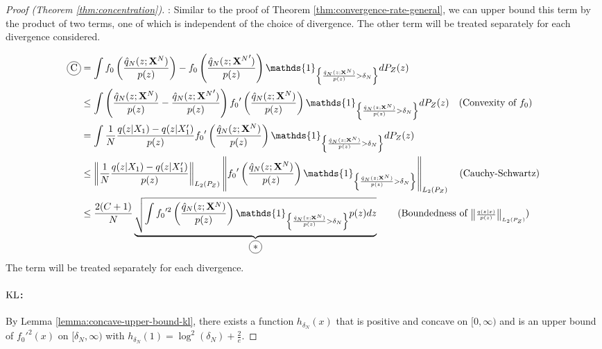 \begin{proof}[Proof (Theorem \ref{thm:concentration})]
: Similar to the proof of Theorem \ref{thm:convergence-rate-general}, we can upper bound this term by the product of two terms, one of which is independent of the choice of divergence.
The other term will be treated separately for each divergence considered.


\begin{align*}
    \encircle{C} &= \int {f_0}\left( \frac{\hat{q}_N(z;\XN)}{p(z)}\right) - {f_0}\left( \frac{\hat{q}_N(z;{\XN}')}{p(z)} \right) \mathds{1}_{\left\lbrace \frac{\hat{q}_N(z;\XN)}{p(z)} > \delta_N \right\rbrace} dP_Z(z) \\
    &\leq \int \left(\frac{\hat{q}_N(z;\XN)}{p(z)} - \frac{\hat{q}_N(z;{\XN}')}{p(z)}\right) {f_0}'\left(\frac{\hat{q}_N(z;\XN)}{p(z)} \right) \mathds{1}_{\left\lbrace \frac{\hat{q}_N(z;\XN)}{p(z)} > \delta_N \right\rbrace} dP_Z(z) 
    \quad \text{(Convexity of ${f_0}$)}
    \\
    &= \int \frac{1}{N}\frac{q(z|X_1) - q(z|X'_1)}{p(z)}  {f_0}'\left(\frac{\hat{q}_N(z;\XN)}{p(z)} \right) \mathds{1}_{\left\lbrace \frac{\hat{q}_N(z;\XN)}{p(z)} > \delta_N \right\rbrace} dP_Z(z) \\
    &\leq \left\| \frac{1}{N}\frac{q(z|X_1) - q(z|X'_1)}{p(z)}\right\|_{L_2(P_Z)}
    \left\| {f_0}'\left(\frac{\hat{q}_N(z;\XN)}{p(z)} \right) \mathds{1}_{\left\lbrace \frac{\hat{q}_N(z;\XN)}{p(z)} > \delta_N \right\rbrace} \right\|_{L_2(P_Z)} 
    \quad \text{(Cauchy-Schwartz)}
    \\
    &\leq \frac{2(C+1)}{N} \underbrace{\sqrt{\int {f_0}'^2\left(\frac{\hat{q}_N(z;\XN)}{p(z)} \right) \mathds{1}_{\left\lbrace \frac{\hat{q}_N(z;\XN)}{p(z)} > \delta_N \right\rbrace} p(z) dz }}_{\encircle{$*$}}
    \qquad \text{(Boundedness of ${\scriptscriptstyle\left\| \frac{q(z|x)}{p(z)}\right\|_{L_2(P_Z)}}$)}
    \\
\end{align*}
The term \encircle{$*$} will be treated separately for each divergence.

\paragraph{$\mathrm{KL}$:}

By Lemma \ref{lemma:concave-upper-bound-kl}, there exists a function $h_{\delta_N}(x)$ that is positive and concave on $[0, \infty)$ and is an upper bound of $f_0'^2(x)$ on $[\delta_N, \infty)$ with $h_{\delta_N}(1) = \log^2(\delta_N) + \frac{2}{e}$.


\end{proof}
